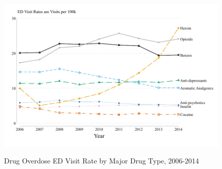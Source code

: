 \documentclass[12pt]{article}
\begin{document}
\begin{figure}[ht!]
		\centering
		\caption{Drug Overdose ED Visit Rate by Major Drug Type, 2006-2014}
\begin{center}
			  	\includegraphics[width=\linewidth]{../results/figures/figure_4_top_drug_ed_rate_06_14.pdf}
		\end{center}		\label{fig:ed_visits_by_drug_by_time}
	 	\footnotesize{	}
\end{figure}
\end{document}
